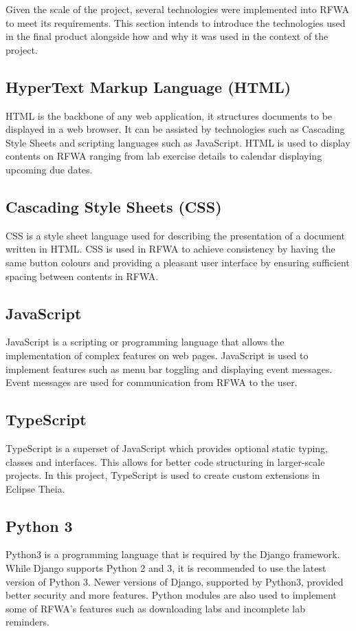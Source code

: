 \documentclass{l4proj}
\begin{document}
Given the scale of the project, several technologies were implemented into RFWA to meet its requirements. This section intends to introduce the technologies used in the final product alongside how and why it was used in the context of the project. 

\subsection{HyperText Markup Language (HTML)}
HTML is the backbone of any web application, it structures documents to be displayed in a web browser. It can be assisted by technologies such as Cascading Style Sheets and scripting languages such as JavaScript. HTML is used to display contents on RFWA ranging from lab exercise details to calendar displaying upcoming due dates. 

\subsection{Cascading Style Sheets (CSS)}
CSS is a style sheet language used for describing the presentation of a document written in HTML. CSS is used in RFWA to achieve consistency by having the same button colours and providing a pleasant user interface by ensuring sufficient spacing between contents in RFWA.

\subsection{JavaScript}
JavaScript is a scripting or programming language that allows the implementation of complex features on web pages. JavaScript is used to implement features such as menu bar toggling and displaying event messages. Event messages are used for communication from RFWA to the user.

\subsection{TypeScript}
TypeScript is a superset of JavaScript which provides optional static typing, classes and interfaces. This allows for better code structuring in larger-scale projects. In this project, TypeScript is used to create custom extensions in Eclipse Theia.

\subsection{Python 3}
Python3 is a programming language that is required by the Django framework. While Django supports Python 2 and 3, it is recommended to use the latest version of Python 3. Newer versions of Django, supported by Python3, provided better security and more features. Python modules are also used to implement some of RFWA's features such as downloading labs and incomplete lab reminders.
\end{document}
